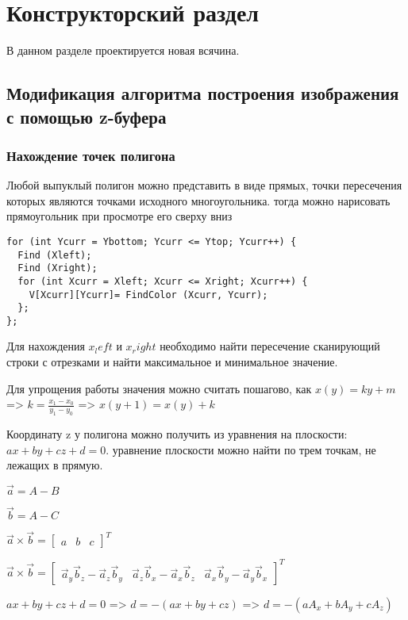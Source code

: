 \chapter{Конструкторский раздел}
\label{cha:design}

В данном разделе проектируется новая всячина.

\section{Модификация алгоритма построения изображения с помощью z-буфера}

\subsection{Нахождение точек полигона}

Любой выпуклый полигон можно представить в виде прямых, точки пересечения которых являются точками исходного многоугольника. тогда можно нарисовать прямоугольник при просмотре его сверху вниз
\begin{lstlisting}
for (int Ycurr = Ybottom; Ycurr <= Ytop; Ycurr++) {
  Find (Xleft);
  Find (Xright);
  for (int Xcurr = Xleft; Xcurr <= Xright; Xcurr++) {
    V[Xcurr][Ycurr]= FindColor (Xcurr, Ycurr);
  };
};
\end{lstlisting}

Для нахождения $x_left$ и $x_right$ необходимо найти пересечение сканирующий строки с  отрезками и найти максимальное и минимальное значение.


Для упрощения работы значения можно считать пошагово, как 
$x(y) = ky + m$ => $k = \frac{x_1 - x_0}{y_1 - y_0}$ => $x(y + 1) = x(y) + k$

Координату z у полигона можно получить из уравнения на плоскости: $ax + by + cz + d = 0$. уравнение плоскости можно найти по трем точкам, не лежащих в прямую. 

$\vec{a} = A - B $

$\vec{b} = A - C $

$\vec{a} \times \vec{b} = \begin{bmatrix}
    a & b & c
\end{bmatrix}^T$

$\vec{a} \times \vec{b} = \begin{bmatrix}
    \vec{a}_y \vec{b}_z - \vec{a}_z \vec{b}_y & 
    \vec{a}_z \vec{b}_x - \vec{a}_x \vec{b}_z &
    \vec{a}_x \vec{b}_y - \vec{a}_y \vec{b}_x 
\end{bmatrix}^T$

$ax + by + cz + d = 0$ => $d = -(ax + by + cz)$ => 
$d = -(a A_x + b A_y + c A_z)$


